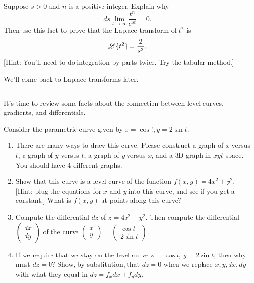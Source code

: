 \begin{problem}
Suppose $s>0$ and $n$ is a positive integer.  Explain why $$ds\lim_{t\to\infty}\frac{t^n}{e^{st}}=0.$$ 
Then use this fact to prove that the Laplace transform of $t^2$ is $$\displaystyle\mathscr{L}\{t^2\} =\frac{2}{s^3}.$$ [Hint: You'll need to do integration-by-parts twice. Try the tabular method.]
\end{problem}

We'll come back to Laplace transforms later. 

\subsection*{\ideaA}



It's time to review some facts about the connection between level curves, gradients, and differentials. 
\begin{problem}
Consider the parametric curve given by $x=\cos t, y=2\sin t$.  
\begin{enumerate}
 \item There are many ways to draw this curve.  Please construct a graph of $x$ versus $t$, a graph of $y$ versus $t$, a graph of $y$ versus $x$, and a 3D graph in $xyt$ space. You should have 4 different graphs. 
 \item {}%
Show that this curve is a level curve of the function $f(x,y) = 4x^2+y^2$. [Hint: plug the equations for $x$ and $y$ into this curve, and see if you get a constant.] What is $f(x,y)$ at points along this curve?
 \item Compute the differential $dz$ of $z=4x^2+y^2$. Then compute the differential 
$\begin{pmatrix}dx\\dy\end{pmatrix}$ 
of the curve 
$\begin{pmatrix}x\\y\end{pmatrix} = 
\begin{pmatrix}\cos t\\2\sin t\end{pmatrix}$.
 \item 
If we require that we stay on the level curve $x = \cos t$, $y=2\sin t$, then why must $dz=0$?  Show, by substitution, that $dz=0$ when we replace $x,y,dx,dy$ with what they equal in $dz = f_xdx+f_ydy$.
\end{enumerate}
\end{problem}


